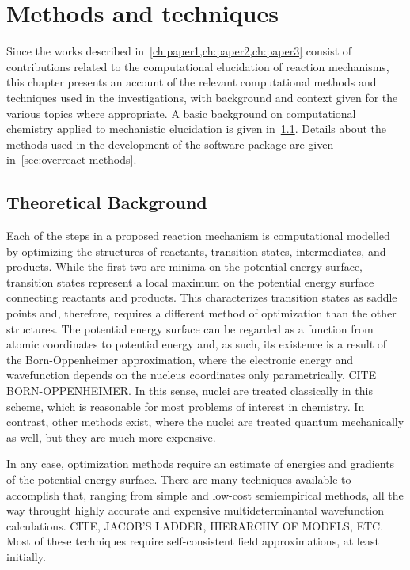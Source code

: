\chapter{Methods and techniques}%
\label{ch:methods}

Since the works described in~\cref{ch:paper1,ch:paper2,ch:paper3} consist
of contributions related to the computational elucidation of reaction mechanisms,
this chapter presents an account of the relevant computational methods and
techniques used in the investigations,
with background and context given
for the various topics where appropriate.
A basic background on computational chemistry applied
to mechanistic elucidation is given in~\cref{sec:background-methods}.
Details about the methods used in the development of the \overreact software
package are given in~\cref{sec:overreact-methods}.

\section{Theoretical Background}%
\label{sec:background-methods}

Each of the steps in a proposed reaction mechanism is computational modelled
by optimizing the structures of reactants, transition states, intermediates, and products.
While the first two are minima on the potential energy surface, transition
states represent a local maximum on the potential energy surface connecting
reactants and products.
This characterizes transition states as saddle points and, therefore, requires
a different method of optimization than the other structures.
The potential energy surface can be regarded as a function from atomic coordinates to potential energy and,
as such, its existence is a result of the Born-Oppenheimer approximation,
where the electronic energy and wavefunction depends on the nucleus coordinates
only parametrically.
CITE BORN-OPPENHEIMER.\@
In this sense, nuclei are treated classically in this scheme, which is reasonable for most problems of interest in chemistry.
In contrast, other methods exist, where the nuclei are treated quantum mechanically as well,
but they are much more expensive.

In any case, optimization methods require an estimate of energies and gradients
of the potential energy surface.
There are many techniques available to accomplish that,
ranging from simple and low-cost semiempirical methods,
all the way throught highly accurate and expensive multideterminantal wavefunction calculations.
CITE, JACOB'S LADDER, HIERARCHY OF MODELS, ETC.\@
Most of these techniques require self-consistent field approximations, at least initially.

